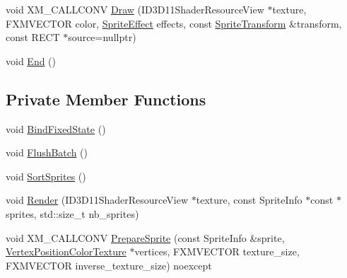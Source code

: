 \begin{DoxyCompactItemize}
\item 
void X\+M\+\_\+\+C\+A\+L\+L\+C\+O\+NV \mbox{\hyperlink{classmage_1_1rendering_1_1_sprite_batch_1_1_impl_a62585b07c1b2ede917ad49c0cfda57f1}{Draw}} (I\+D3\+D11\+Shader\+Resource\+View $\ast$texture, F\+X\+M\+V\+E\+C\+T\+OR color, \mbox{\hyperlink{namespacemage_1_1rendering_a4dbc3536c87b906f1d41d863ec458e78}{Sprite\+Effect}} effects, const \mbox{\hyperlink{classmage_1_1_sprite_transform}{Sprite\+Transform}} \&transform, const R\+E\+CT $\ast$source=nullptr)
\item 
void \mbox{\hyperlink{classmage_1_1rendering_1_1_sprite_batch_1_1_impl_a46d4871b99ac78e00f703ca4297e67f3}{End}} ()
\end{DoxyCompactItemize}
\subsection*{Private Member Functions}
\begin{DoxyCompactItemize}
\item 
void \mbox{\hyperlink{classmage_1_1rendering_1_1_sprite_batch_1_1_impl_ab07518664c50c9ddd08eb484bc0df0e0}{Bind\+Fixed\+State}} ()
\item 
void \mbox{\hyperlink{classmage_1_1rendering_1_1_sprite_batch_1_1_impl_a65afd35385400d629abc9f60adfadeff}{Flush\+Batch}} ()
\item 
void \mbox{\hyperlink{classmage_1_1rendering_1_1_sprite_batch_1_1_impl_a2573f39b9f7f87b2acd7eadc348c1e2b}{Sort\+Sprites}} ()
\item 
void \mbox{\hyperlink{classmage_1_1rendering_1_1_sprite_batch_1_1_impl_a9371c90f00b4bd2b606ee2b5c8ee5e5e}{Render}} (I\+D3\+D11\+Shader\+Resource\+View $\ast$texture, const Sprite\+Info $\ast$const $\ast$sprites, std\+::size\+\_\+t nb\+\_\+sprites)
\item 
void X\+M\+\_\+\+C\+A\+L\+L\+C\+O\+NV \mbox{\hyperlink{classmage_1_1rendering_1_1_sprite_batch_1_1_impl_adce1a1942833a97fb14a20bc4add8c31}{Prepare\+Sprite}} (const Sprite\+Info \&sprite, \mbox{\hyperlink{structmage_1_1rendering_1_1_vertex_position_color_texture}{Vertex\+Position\+Color\+Texture}} $\ast$vertices, F\+X\+M\+V\+E\+C\+T\+OR texture\+\_\+size, F\+X\+M\+V\+E\+C\+T\+OR inverse\+\_\+texture\+\_\+size) noexcept
\end{DoxyCompactItemize}
